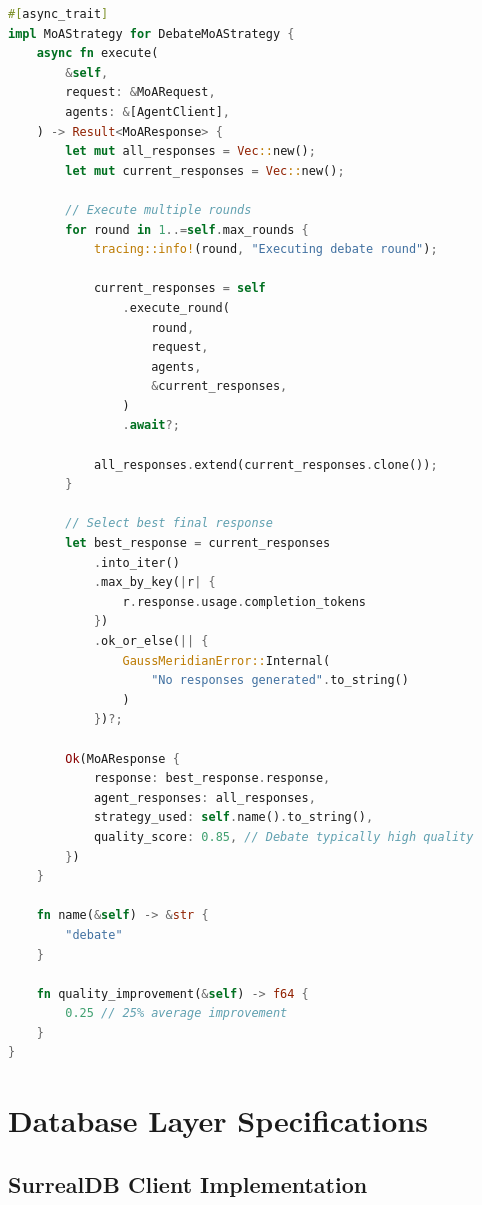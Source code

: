 \documentclass[12pt,a4paper,twoside]{report}
\begin{document}
\begin{lstlisting}[language=Rust,caption={Debate MoA Strategy - crates/gaussmeridian-moa/src/strategies/debate.rs}]
#[async_trait]
impl MoAStrategy for DebateMoAStrategy {
    async fn execute(
        &self,
        request: &MoARequest,
        agents: &[AgentClient],
    ) -> Result<MoAResponse> {
        let mut all_responses = Vec::new();
        let mut current_responses = Vec::new();
        
        // Execute multiple rounds
        for round in 1..=self.max_rounds {
            tracing::info!(round, "Executing debate round");
            
            current_responses = self
                .execute_round(
                    round,
                    request,
                    agents,
                    &current_responses,
                )
                .await?;
            
            all_responses.extend(current_responses.clone());
        }
        
        // Select best final response
        let best_response = current_responses
            .into_iter()
            .max_by_key(|r| {
                r.response.usage.completion_tokens
            })
            .ok_or_else(|| {
                GaussMeridianError::Internal(
                    "No responses generated".to_string()
                )
            })?;
        
        Ok(MoAResponse {
            response: best_response.response,
            agent_responses: all_responses,
            strategy_used: self.name().to_string(),
            quality_score: 0.85, // Debate typically high quality
        })
    }
    
    fn name(&self) -> &str {
        "debate"
    }
    
    fn quality_improvement(&self) -> f64 {
        0.25 // 25% average improvement
    }
}
\end{lstlisting}


\chapter{Database Layer Specifications}

\section{SurrealDB Client Implementation}
\end{document}
